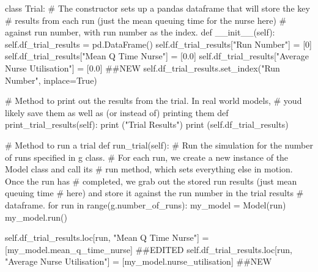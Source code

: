 \documentclass[
  letterpaper,
  DIV=11,
  numbers=noendperiod]{scrreprt}
\newenvironment{Shaded}{\begin{snugshade}}{\end{snugshade}}
\newcommand{\BuiltInTok}[1]{\textcolor[rgb]{0.00,0.23,0.31}{#1}}
\newcommand{\CommentTok}[1]{\textcolor[rgb]{0.37,0.37,0.37}{#1}}
\newcommand{\ControlFlowTok}[1]{\textcolor[rgb]{0.00,0.23,0.31}{#1}}
\newcommand{\DecValTok}[1]{\textcolor[rgb]{0.68,0.00,0.00}{#1}}
\newcommand{\FloatTok}[1]{\textcolor[rgb]{0.68,0.00,0.00}{#1}}
\newcommand{\FunctionTok}[1]{\textcolor[rgb]{0.28,0.35,0.67}{#1}}
\newcommand{\KeywordTok}[1]{\textcolor[rgb]{0.00,0.23,0.31}{#1}}
\newcommand{\NormalTok}[1]{\textcolor[rgb]{0.00,0.23,0.31}{#1}}
\newcommand{\OperatorTok}[1]{\textcolor[rgb]{0.37,0.37,0.37}{#1}}
\newcommand{\StringTok}[1]{\textcolor[rgb]{0.13,0.47,0.30}{#1}}
\newcommand{\VariableTok}[1]{\textcolor[rgb]{0.07,0.07,0.07}{#1}}
\begin{document}
\begin{tcolorbox}
\begin{Shaded}
\begin{Highlighting}[]
\KeywordTok{class}\NormalTok{ Trial:}
    \CommentTok{\# The constructor sets up a pandas dataframe that will store the key}
    \CommentTok{\# results from each run (just the mean queuing time for the nurse here)}
    \CommentTok{\# against run number, with run number as the index.}
    \KeywordTok{def}  \FunctionTok{\_\_init\_\_}\NormalTok{(}\VariableTok{self}\NormalTok{):}
        \VariableTok{self}\NormalTok{.df\_trial\_results }\OperatorTok{=}\NormalTok{ pd.DataFrame()}
        \VariableTok{self}\NormalTok{.df\_trial\_results[}\StringTok{"Run Number"}\NormalTok{] }\OperatorTok{=}\NormalTok{ [}\DecValTok{0}\NormalTok{]}
        \VariableTok{self}\NormalTok{.df\_trial\_results[}\StringTok{"Mean Q Time Nurse"}\NormalTok{] }\OperatorTok{=}\NormalTok{ [}\FloatTok{0.0}\NormalTok{]}
        \VariableTok{self}\NormalTok{.df\_trial\_results[}\StringTok{"Average Nurse Utilisation"}\NormalTok{] }\OperatorTok{=}\NormalTok{ [}\FloatTok{0.0}\NormalTok{] }\CommentTok{\#\#NEW}
        \VariableTok{self}\NormalTok{.df\_trial\_results.set\_index(}\StringTok{"Run Number"}\NormalTok{, inplace}\OperatorTok{=}\VariableTok{True}\NormalTok{)}

    \CommentTok{\# Method to print out the results from the trial.  In real world models,}
    \CommentTok{\# you\textquotesingle{}d likely save them as well as (or instead of) printing them}
    \KeywordTok{def}\NormalTok{ print\_trial\_results(}\VariableTok{self}\NormalTok{):}
        \BuiltInTok{print}\NormalTok{ (}\StringTok{"Trial Results"}\NormalTok{)}
        \BuiltInTok{print}\NormalTok{ (}\VariableTok{self}\NormalTok{.df\_trial\_results)}

    \CommentTok{\# Method to run a trial}
    \KeywordTok{def}\NormalTok{ run\_trial(}\VariableTok{self}\NormalTok{):}
        \CommentTok{\# Run the simulation for the number of runs specified in g class.}
        \CommentTok{\# For each run, we create a new instance of the Model class and call its}
        \CommentTok{\# run method, which sets everything else in motion.  Once the run has}
        \CommentTok{\# completed, we grab out the stored run results (just mean queuing time}
        \CommentTok{\# here) and store it against the run number in the trial results}
        \CommentTok{\# dataframe.}
        \ControlFlowTok{for}\NormalTok{ run }\KeywordTok{in} \BuiltInTok{range}\NormalTok{(g.number\_of\_runs):}
\NormalTok{            my\_model }\OperatorTok{=}\NormalTok{ Model(run)}
\NormalTok{            my\_model.run()}

            \VariableTok{self}\NormalTok{.df\_trial\_results.loc[run, }\StringTok{"Mean Q Time Nurse"}\NormalTok{] }\OperatorTok{=}\NormalTok{ [my\_model.mean\_q\_time\_nurse] }\CommentTok{\#\#EDITED}
            \VariableTok{self}\NormalTok{.df\_trial\_results.loc[run, }\StringTok{"Average Nurse Utilisation"}\NormalTok{] }\OperatorTok{=}\NormalTok{ [my\_model.nurse\_utilisation] }\CommentTok{\#\#NEW}


\end{Highlighting}
\end{Shaded}
\end{tcolorbox}
\end{document}
